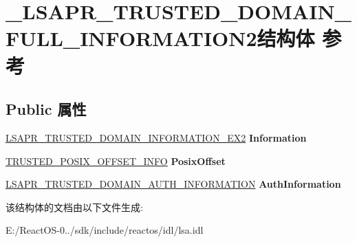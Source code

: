 \hypertarget{struct___l_s_a_p_r___t_r_u_s_t_e_d___d_o_m_a_i_n___f_u_l_l___i_n_f_o_r_m_a_t_i_o_n2}{}\section{\+\_\+\+L\+S\+A\+P\+R\+\_\+\+T\+R\+U\+S\+T\+E\+D\+\_\+\+D\+O\+M\+A\+I\+N\+\_\+\+F\+U\+L\+L\+\_\+\+I\+N\+F\+O\+R\+M\+A\+T\+I\+O\+N2结构体 参考}
\label{struct___l_s_a_p_r___t_r_u_s_t_e_d___d_o_m_a_i_n___f_u_l_l___i_n_f_o_r_m_a_t_i_o_n2}
\subsection*{Public 属性}
\begin{DoxyCompactItemize}
\item 
\mbox{\label{struct___l_s_a_p_r___t_r_u_s_t_e_d___d_o_m_a_i_n___f_u_l_l___i_n_f_o_r_m_a_t_i_o_n2_a427546d0d804e2454c5b2e99bd06ff64}} 
\hyperlink{struct___l_s_a_p_r___t_r_u_s_t_e_d___d_o_m_a_i_n___i_n_f_o_r_m_a_t_i_o_n___e_x2}{L\+S\+A\+P\+R\+\_\+\+T\+R\+U\+S\+T\+E\+D\+\_\+\+D\+O\+M\+A\+I\+N\+\_\+\+I\+N\+F\+O\+R\+M\+A\+T\+I\+O\+N\+\_\+\+E\+X2} {\bfseries Information}
\item 
\mbox{\label{struct___l_s_a_p_r___t_r_u_s_t_e_d___d_o_m_a_i_n___f_u_l_l___i_n_f_o_r_m_a_t_i_o_n2_acb142c2a06cbe4e634f6ce615b0e9565}} 
\hyperlink{struct___t_r_u_s_t_e_d___p_o_s_i_x___o_f_f_s_e_t___i_n_f_o}{T\+R\+U\+S\+T\+E\+D\+\_\+\+P\+O\+S\+I\+X\+\_\+\+O\+F\+F\+S\+E\+T\+\_\+\+I\+N\+FO} {\bfseries Posix\+Offset}
\item 
\mbox{\label{struct___l_s_a_p_r___t_r_u_s_t_e_d___d_o_m_a_i_n___f_u_l_l___i_n_f_o_r_m_a_t_i_o_n2_a9015f232e757b759579050bf5147774a}} 
\hyperlink{struct___l_s_a_p_r___t_r_u_s_t_e_d___d_o_m_a_i_n___a_u_t_h___i_n_f_o_r_m_a_t_i_o_n}{L\+S\+A\+P\+R\+\_\+\+T\+R\+U\+S\+T\+E\+D\+\_\+\+D\+O\+M\+A\+I\+N\+\_\+\+A\+U\+T\+H\+\_\+\+I\+N\+F\+O\+R\+M\+A\+T\+I\+ON} {\bfseries Auth\+Information}
\end{DoxyCompactItemize}


该结构体的文档由以下文件生成\+:\begin{DoxyCompactItemize}
\item 
E\+:/\+React\+O\+S-\/0../sdk/include/reactos/idl/lsa.\+idl\end{DoxyCompactItemize}
